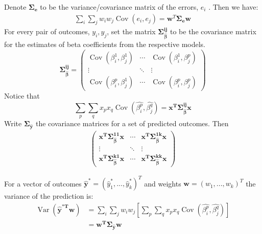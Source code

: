 \documentclass[12pt]{article}
\newcommand{\Var}{\operatorname{Var}}
\newcommand{\Cov}{\operatorname{Cov}}
\renewcommand{\vec}[1]{\mathbf{#1}}
\begin{document}
Denote \(\vec{\Sigma_e}\) to be the variance/covariance matrix of the errors, \(e_i\) . Then we have:
\begin{align}
    \sum_i \sum_j w_i w_j \Cov(e_i, e_j) = \vec{w}^T \vec{\Sigma_e} \vec{w}
\end{align}
For every pair of outcomes, \(y_i, y_j\), set the  matrix \(\vec{\Sigma _ {\hat{\beta}}^{ij}}\) to be the covariance matrix for the estimates of beta coefficients from the respective models.
\begin{equation}
     \vec{\Sigma _ {\hat{\beta}}^{ij}} = 
     \begin{pmatrix}
         \Cov(\beta_i^1, \beta_j^1) & \cdots & \Cov(\beta_i^1, \beta_j^p) \\
         \vdots & \ddots & \vdots \\
        \Cov(\beta_i^p, \beta_j^1) & \cdots & \Cov(\beta_i^p, \beta_j^p)
     \end{pmatrix} 
\end{equation}
Notice that 
\begin{equation}
      \sum_p \sum_q x_p x_q \Cov(\hat{\beta_i^p},  \hat{\beta_j^q}) = \vec{x^T \vec{\Sigma _ {\hat{\beta}}^{ij}} x}
\end{equation}
Write \(\vec{\Sigma_{\hat{y}}}\) the covariance matrices for a set of predicted outcomes. Then 
\begin{align*}
     \begin{pmatrix}
         \vec{x^T \vec{\Sigma _ {\hat{\beta}}^{11}} x} & \cdots & \vec{x^T \vec{\Sigma _ {\hat{\beta}}^{1k}} x} \\
         \vdots & \ddots & \vdots \\
        \vec{x^T \vec{\Sigma _ {\hat{\beta}}^{k1}} x} &\cdots & \vec{x^T \vec{\Sigma _ {\hat{\beta}}^{kk}} x}
     \end{pmatrix}  
\end{align*}

 For a vector of outcomes \(\vec{\hat{y}^*} = (\hat{y}^*_1, ..., \hat{y}^*_k)^T\) and weights \(\vec{w} = (w_1,...,w_k)^T\) the variance of the prediction is:
\begin{align*}
       \Var(\vec{\hat{y}^{*T}w}) &=  \sum_i \sum_j w_i w_j [\sum_p \sum_q x_p x_q \Cov(\hat{\beta_i^p},  \hat{\beta_j^q})] \\
                                 &= \vec{w^T \Sigma_{\hat{y}} w}
\end{align*}
\end{document}
